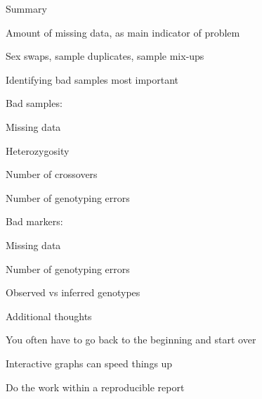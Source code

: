 \documentclass[aspectratio=169,12pt,t]{beamer}
\begin{document}
\begin{frame}[c]{Summary}

  \bbi
\item Amount of missing data, as main indicator of problem
\item Sex swaps, sample duplicates, sample mix-ups
\item Identifying bad samples most important
\item Bad samples:
  \bi
\item Missing data
\item Heterozygosity
\item Number of crossovers
\item Number of genotyping errors
  \ei
\item Bad markers:
  \bi
\item Missing data
\item Number of genotyping errors
\item Observed vs inferred genotypes
  \ei
  \ei

\note{
}

\end{frame}




\begin{frame}[c]{Additional thoughts}

  \bbi
\item You often have to go back to the beginning and start over
\item Interactive graphs can speed things up
\item Do the work within a reproducible report
  \ei

\note{
}

\end{frame}
\end{document}
